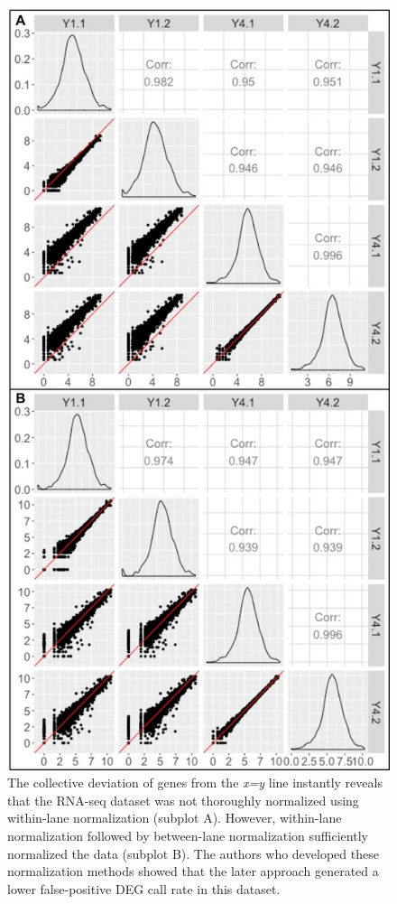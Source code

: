 \documentclass{bioinfo}
\begin{document}
\begin{figure}[!tpb]
\centerline{\includegraphics[width=\columnwidth]{../Bioinformatics/Pictures/Figure4.png}}
\caption{The collective deviation of genes from the \textit{x=y} line instantly reveals that the RNA-seq dataset was not thoroughly normalized using within-lane normalization (subplot A). However, within-lane normalization followed by between-lane normalization sufficiently normalized the data (subplot B). The authors who developed these normalization methods showed that the later approach generated a lower false-positive DEG call rate in this dataset.
\label{withinbtwn}}
\end{figure}
\end{document}
